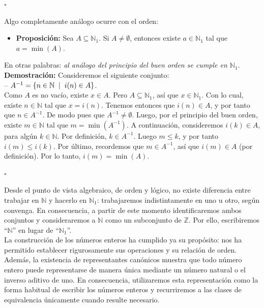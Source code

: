 \documentclass[10 pt]{article}
\begin{document}
\begin{flushright}
    $\square$
\end{flushright}

\Large{Algo completamente análogo ocurre con el orden:} \\

\begin{itemize}
    \item \Large{\textbf{Proposición:} Sea $A \subseteq \mathbb N_1$. Si $A \neq \emptyset$, entonces existe $a \in \mathbb N_1$ tal que $a=\min(A)$.} \\
\end{itemize}

\Large{En otras palabras: \textit{al análogo del principio del buen orden se cumple en $\mathbb N_1$}.} \\

\Large{\textbf{Demostración:} Consideremos el siguiente conjunto: \\

-- $A^{-1}=\{n \in \mathbb N \hspace{0.2 cm}|\hspace{0.2 cm}i(n) \in A\}$. \\

Como $A$ es no vacío, existe $x \in A$. Pero $A \subseteq \mathbb N_1$, así que $x \in \mathbb N_1$. Con lo cual, existe $n \in \mathbb N$ tal que $x=i(n)$. Tenemos entonces que $i(n) \in A$, y por tanto que $n \in A^{-1}$. De modo pues que $A^{-1} \neq \emptyset$. Luego, por el principio del buen orden, existe $m \in \mathbb N$ tal que $m=\min(A^{-1})$. A continuación, consideremos $i(k) \in A$, para algún $k \in \mathbb N$. Por definición, $k \in A^{-1}$. Luego $m \leq k$, y por tanto $i(m) \leq i(k)$. Por último, recordemos que $m \in A^{-1}$, así que $i(m) \in A$ (por definición). Por lo tanto, $i(m)=\min(A)$.} \\

\begin{flushright}
    $\square$
\end{flushright}

\Large{Desde el punto de vista algebraico, de orden y lógico, no existe diferencia entre trabajar en $\mathbb N$ y hacerlo en $\mathbb N_1$: trabajaremos indistintamente en uno u otro, según convenga. En consecuencia, a partir de este momento identificaremos ambos conjuntos y consideraremos a $\mathbb N$ como un subconjunto de $\mathbb Z$. Por ello, escribiremos ``$\mathbb N$'' en lugar de ``$\mathbb N_1$''. \\

La construcción de los números enteros ha cumplido ya su propósito: nos ha permitido establecer rigurosamente sus operaciones y su relación de orden. Además, la existencia de representantes canónicos muestra que todo número entero puede representarse de manera única mediante un número natural o el inverso aditivo de uno. En consecuencia, utilizaremos esta representación como la forma habitual de escribir los números enteros y recurriremos a las clases de equivalencia únicamente cuando resulte necesario.} \\
\end{document}
